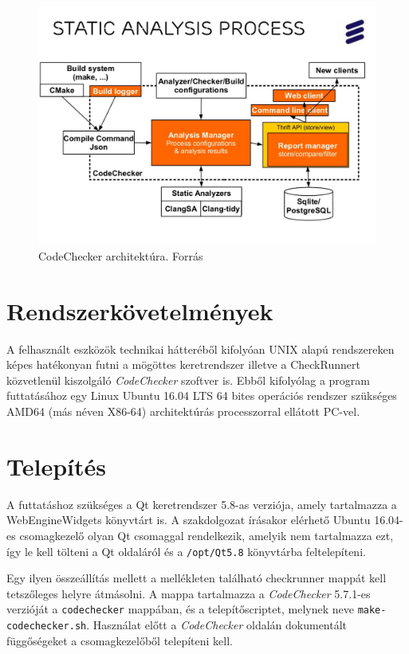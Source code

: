 \documentclass[a4paper,12pt]{report}
\begin{document}
\begin{figure}[h]
\caption{CodeChecker architektúra. Forrás \cite{codecheckerslide}}
\centering
\includegraphics[scale=0.2]{codechecker.png}
\end{figure}

\section{Rendszerkövetelmények}
A felhasznált eszközök technikai hátteréből kifolyóan UNIX alapú rendszereken képes hatékonyan futni a mögöttes keretrendszer illetve a CheckRunnert közvetlenül kiszolgáló \emph{CodeChecker} szoftver is. Ebből kifolyólag a program futtatásához egy Linux Ubuntu 16.04 LTS 64 bites operációs rendszer szükséges AMD64 (más néven X86-64) architektúrás processzorral ellátott PC-vel.

\section{Telepítés}
A futtatáshoz szükséges a Qt keretrendszer 5.8-as verziója, amely tartalmazza a WebEngineWidgets könyvtárt is. A szakdolgozat írásakor elérhető Ubuntu 16.04-es csomagkezelő olyan Qt csomaggal rendelkezik, amelyik nem tartalmazza ezt, így le kell tölteni a Qt oldaláról \cite{qt5downloadpage} és a \texttt{/opt/Qt5.8} könyvtárba feltelepíteni.

Egy ilyen összeállítás mellett a mellékleten található checkrunner mappát kell tetszőleges helyre átmásolni. A mappa tartalmazza a \emph{CodeChecker} 5.7.1-es verzióját a \texttt{codechecker} mappában, és a telepítőscriptet, melynek neve \texttt{make-codechecker.sh}. Használat előtt a \emph{CodeChecker} oldalán dokumentált függőségeket a csomagkezelőből telepíteni kell.
\end{document}
